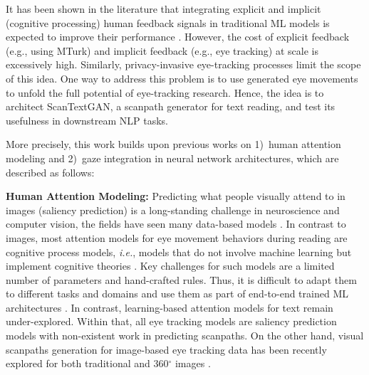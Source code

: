 It has been shown in the literature that integrating explicit \citep{bai2022training,ouyang2022training} and implicit (cognitive processing) human feedback signals in traditional ML models is expected to improve their performance \cite{Just1980}. However, the cost of explicit feedback (e.g., using MTurk) and implicit feedback (e.g., eye tracking) at scale is excessively high. Similarly, privacy-invasive eye-tracking processes limit the scope of this idea. One way to address this problem is to use generated eye movements to unfold the full potential of eye-tracking research. Hence, the idea is to architect ScanTextGAN, a scanpath generator for text reading, and test its usefulness in downstream NLP tasks. 

More precisely, this work builds upon previous works on 1)~human attention modeling and 2)~gaze integration in neural network architectures, which are described as follows:

\textbf{Human Attention Modeling:} Predicting what people visually attend to in images (saliency prediction) is a long-standing challenge
in neuroscience and computer vision, the fields have seen many data-based models \cite{wang2021salient}. In contrast to images, most attention models for eye movement behaviors during reading are cognitive process models, \textit{i.e.}, models that do not involve machine learning but implement cognitive theories \cite{engbert2005swift,xia-etal-2019-automatic}. Key challenges for such models are a limited number of parameters and hand-crafted rules. Thus, it is difficult to adapt them to different tasks and domains and use them as part of end-to-end trained ML architectures \cite{kotseruba202040}. In contrast, learning-based attention models for text remain under-explored. Within that, all eye tracking models are saliency prediction models with non-existent work in predicting scanpaths. On the other hand, visual scanpaths generation for image-based eye tracking data has been recently explored for both traditional \cite{PathGANScanPathGen} and 360$^{\circ}$ images \cite{ScanGAN360}.

